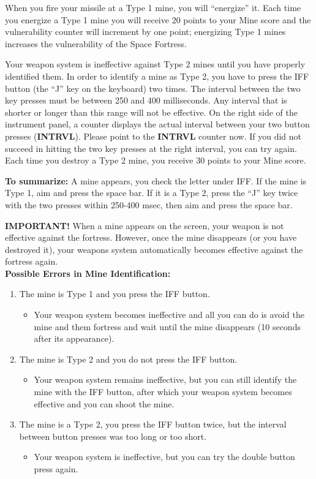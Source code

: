 \documentclass[letterpaper,12pt]{article}
\begin{document}
When you fire your missile at a Type 1 mine, you will ``energize'' it. Each time you energize a Type
1 mine you will receive 20 points to your Mine score and the vulnerability counter will increment by
one point; energizing Type 1 mines increases the vulnerability of the Space Fortress.

Your weapon system is ineffective against Type 2 mines until you have properly identified them. In
order to identify a mine as Type 2, you have to press the IFF button (the “J” key on the keyboard)
two times. The interval between the two key presses must be between 250 and 400 milliseconds. Any
interval that is shorter or longer than this range will not be effective. On the right side of the
instrument panel, a counter displays the actual interval between your two button presses
(\textbf{INTRVL}). Please point to the \textbf{INTRVL} counter now. If you did not succeed in
hitting the two key presses at the right interval, you can try again. Each time you destroy a Type 2
mine, you receive 30 points to your Mine score.

\textbf{To summarize:} A mine appears, you check the letter under IFF. If the mine is Type 1, aim
and press the space bar. If it is a Type 2, press the ``J'' key twice with the two presses within
250-400 msec, then aim and press the space bar.

\textbf{IMPORTANT!} When a mine appears on the screen, your weapon is not effective against
the fortress. However, once the mine disappears (or you have destroyed it), your weapons system
automatically becomes effective against the fortress again.\\

\textbf{Possible Errors in Mine Identification:}
\begin{enumerate}
\item The mine is Type 1 and you press the IFF button.
\begin{itemize}
\item Your weapon system becomes ineffective and all you can do is avoid the mine and them fortress
and wait until the mine disappears (10 seconds after its appearance).
\end{itemize}
\item The mine is Type 2 and you do not press the IFF button.
\begin{itemize}
\item Your weapon system remains ineffective, but you can still identify the mine with the IFF
button, after which your weapon system becomes effective and you can shoot the mine.
\end{itemize}
\item The mine is a Type 2, you press the IFF button twice, but the interval between button presses
was too long or too short.
\begin{itemize}
\item Your weapon system is ineffective, but you can try the double button press again.
\end{itemize}

\end{enumerate}
\end{document}
